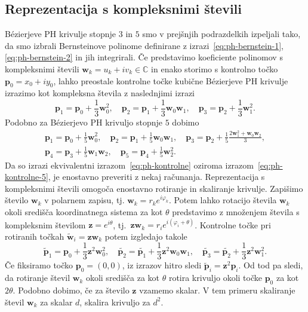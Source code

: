 \documentclass[isrm2, tisk]{fmfdelo}
\newcommand{\C}{\mathbb C}
\newcommand{\p}{\mathbf{p}}
\begin{document}
    \subsection{Reprezentacija s kompleksnimi števili}\label{subsec:complex-repr}
    Bézierjeve PH krivulje stopnje $3$ in $5$ smo v prejšnjih podrazdelkih izpeljali tako, da smo izbrali Bernsteinove polinome definirane z izrazi~\eqref{eq:ph-bernstein-1},\eqref{eq:ph-bernstein-2} in jih integrirali.
    Če predstavimo koeficiente polinomov s kompleksnimi števili $\mathbf{w}_k = u_k + iv_k\in \C$ in enako storimo s kontrolno točko $\p_0=x_0 + iy_0$, lahko preostale kontrolne točke kubične Bézierjeve PH krivulje izrazimo kot kompleksna števila z naslednjimi izrazi
    \[\p_1=\p_0+\frac{1}{3}\mathbf{w}_0^2,\quad \p_2=\p_1+\frac{1}{3}\mathbf{w}_0\mathbf{w}_1,\quad \p_3=\p_2+\frac{1}{3}\mathbf{w}_1^2.\]
    Podobno za Bézierjevo PH krivuljo stopnje $5$ dobimo
    \begin{gather*}
        \p_1=\p_0+\frac{1}{5}\mathbf{w}_0^2,\quad \p_2=\p_1 +\frac{1}{5}\mathbf{w}_0\mathbf{w}_1,\quad  \p_3=\p_2+\frac{1}{5} \frac{2\mathbf{w}_1^2 + \mathbf{w}_0\mathbf{w}_2}{3}, \\
        \p_4=\p_3+\frac{1}{5}\mathbf{w}_1\mathbf{w}_2,\quad \p_5=\p_4+\frac{1}{5}\mathbf{w}_2^2.
    \end{gather*}
    Da so izrazi ekvivalentni izrazom~\eqref{eq:ph-kontrolne} oziroma izrazom~\eqref{eq:ph-kontrolne-5}, je enostavno preveriti z nekaj računanja.
    Reprezentacija s kompleksnimi števili omogoča enostavno rotiranje in skaliranje krivulje.
    Zapišimo število $\mathbf{w}_k$ v polarnem zapisu, tj. $\mathbf{w}_k=r_k e^{i\varphi_k}$.
    Potem lahko rotacijo števila $\mathbf{w}_k$ okoli središča koordinatnega sistema za kot $\theta$ predstavimo z množenjem števila s kompleksnim številom $\mathbf{z}=e^{i\theta}$, tj.\ $\mathbf{z}\mathbf{w}_k=r_i e^{i(\varphi_i+\theta)}$.
    Kontrolne točke pri rotiranih točkah $\mathbf{\tilde{w}}_i=\mathbf{z}\mathbf{w}_k$ potem izgledajo takole
    \[\tilde{\p}_1=\p_0+\frac{1}{3}\mathbf{z}^2\mathbf{w}_0^2,\quad \tilde{\p_2}=\tilde{\p_1}+\frac{1}{3}\mathbf{z}^2\mathbf{w}_0\mathbf{w}_1,\quad \tilde{\p_3}=\tilde{\p_2}+\frac{1}{3}\mathbf{z}^2\mathbf{w}_1^2.\]
    Če fiksiramo točko $\p_0=(0,0)$, iz izrazov hitro sledi $\tilde{\p}_i=\mathbf{z}^2\p_i$.
    Od tod pa sledi, da rotiranje števil $\mathbf{w}_k$ okoli središča za kot $\theta$ rotira krivuljo okoli točke $\p_0$ za kot $2\theta$.
    Podobno dobimo, če za število $\mathbf{z}$ vzamemo skalar.
    V tem primeru skaliranje števil $\mathbf{w}_k$ za skalar $d$, skalira krivuljo za $d^2$.
\end{document}
